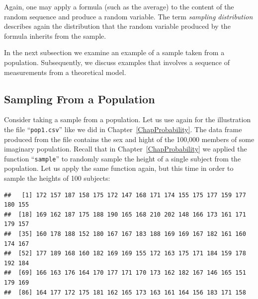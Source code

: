 \documentclass[]{krantz}
\makeatletter
\newenvironment{Shaded}{\begin{snugshade}}{\end{snugshade}}
\newcommand{\DecValTok}[1]{\textcolor[rgb]{0.00,0.00,0.81}{#1}}
\newcommand{\FloatTok}[1]{\textcolor[rgb]{0.00,0.00,0.81}{#1}}
\newcommand{\KeywordTok}[1]{\textcolor[rgb]{0.13,0.29,0.53}{\textbf{#1}}}
\newcommand{\NormalTok}[1]{#1}
\newcommand{\OperatorTok}[1]{\textcolor[rgb]{0.81,0.36,0.00}{\textbf{#1}}}
\newcommand{\StringTok}[1]{\textcolor[rgb]{0.31,0.60,0.02}{#1}}
\newenvironment{kframe}{%
\medskip{}
\setlength{\fboxsep}{.8em}
 \def\at@end@of@kframe{}%
 \ifinner\ifhmode%
  \def\at@end@of@kframe{\end{minipage}}%
  \begin{minipage}{\columnwidth}%
 \fi\fi%
 \def\FrameCommand##1{\hskip\@totalleftmargin \hskip-\fboxsep
 \colorbox{shadecolor}{##1}\hskip-\fboxsep
     \hskip-\linewidth \hskip-\@totalleftmargin \hskip\columnwidth}%
 \MakeFramed {\advance\hsize-\width
   \@totalleftmargin\z@ \linewidth\hsize
   \@setminipage}}%
 {\par\unskip\endMakeFramed%
 \at@end@of@kframe}
\renewenvironment{Shaded}{\begin{kframe}}{\end{kframe}}
\theoremstyle{definition}
\theoremstyle{definition}
\theoremstyle{definition}
\theoremstyle{remark}
\makeatother
\begin{document}
Again, one may apply a formula (such as the average) to the content of
the random sequence and produce a random variable. The term \emph{sampling
distribution} describes again the distribution that the random variable
produced by the formula inherits from the sample.

In the next subsection we examine an example of a sample taken from a
population. Subsequently, we discuss examples that involves a sequence
of measurements from a theoretical model.

\hypertarget{sampling-from-a-population}{%
\subsection{Sampling From a Population}\label{sampling-from-a-population}}

Consider taking a sample from a population. Let us use again for the
illustration the file ``\texttt{pop1.csv}'' like we did in
Chapter~\ref{ChapProbability}. The data frame produced from the file
contains the sex and hight of the 100,000 members of some imaginary
population. Recall that in Chapter~\ref{ChapProbability} we applied the
function ``\texttt{sample}'' to randomly sample the height of a single subject
from the population. Let us apply the same function again, but this time
in order to sample the heights of 100 subjects:

\begin{Shaded}
\end{Shaded}

\begin{verbatim}
##   [1] 172 157 187 158 175 172 147 168 171 174 155 175 177 159 177 180 155
##  [18] 169 162 187 175 188 190 165 168 210 202 148 166 173 161 171 179 157
##  [35] 160 178 188 152 180 167 167 183 188 169 169 167 182 161 160 174 167
##  [52] 177 189 168 160 182 169 169 155 172 163 175 171 184 159 178 192 184
##  [69] 166 163 176 164 170 177 171 170 173 162 182 167 146 165 151 179 169
##  [86] 164 177 172 175 181 162 165 173 163 161 164 156 183 171 158
\end{verbatim}
\end{document}
